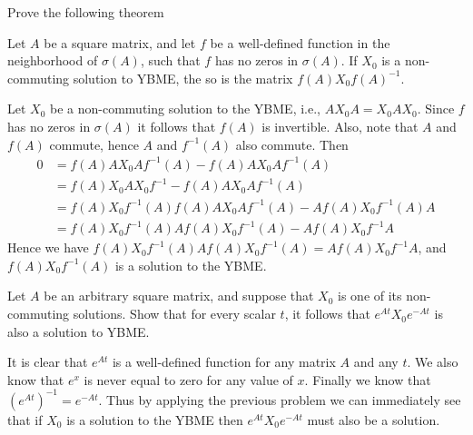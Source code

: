\documentclass{article}
\begin{document}
\begin{problem}
  Prove the following theorem

  Let $A$ be a square matrix, and let $f$ be a well-defined function in the neighborhood of $\sigma(A)$,
  such that $f$ has no zeros in $\sigma(A)$.
  If $X_0$ is a non-commuting solution to YBME, the so is the matrix $f(A) X_0 f(A)^{-1}$.
\end{problem}

\begin{solution}
  Let $X_0$ be a non-commuting solution to the YBME, i.e., $A X_0 A = X_0 A X_0$.
  Since $f$ has no zeros in $\sigma(A)$ it follows that $f(A)$ is invertible.
  Also, note that $A$ and $f(A)$ commute, hence $A$ and $f^{-1}(A)$ also commute.
  Then
  \[\begin{aligned}
    0 &= f(A) A X_0 A f^{-1}(A) - f(A) A X_0 A f^{-1}(A)\\ 
    &= f(A) X_0 A X_0 f^{-1} - f(A) A X_0 A f^{-1}(A)\\
    &= f(A) X_0 f^{-1}(A) f(A) A X_0 A f^{-1}(A) - A f(A) X_0 f^{-1}(A) A\\
    &= f(A) X_0 f^{-1}(A) A f(A) X_0 f^{-1}(A) - A f(A) X_0 f^{-1} A
  \end{aligned}\]
  Hence we have $f(A) X_0 f^{-1}(A) A f(A) X_0 f^{-1}(A) = A f(A) X_0 f^{-1} A$, and $f(A) X_0 f^{-1}(A)$ is a solution to the YBME.
\end{solution}

\begin{problem}
  Let $A$ be an arbitrary square matrix, and suppose that $X_0$ is one of its non-commuting solutions.
  Show that for every scalar $t$, it follows that $e^{At} X_0 e^{-At}$ is also a solution to YBME.
\end{problem}

\begin{solution}
  It is clear that $e^{At}$ is a well-defined function for any matrix $A$ and any $t$.
  We also know that $e^x$ is never equal to zero for any value of $x$.
  Finally we know that $(e^{At})^{-1} = e^{-At}$.
  Thus by applying the previous problem we can immediately see that if $X_0$ is a solution to the YBME then $e^{At} X_0 e^{-At}$ must also be a solution.
\end{solution}
\end{document}
